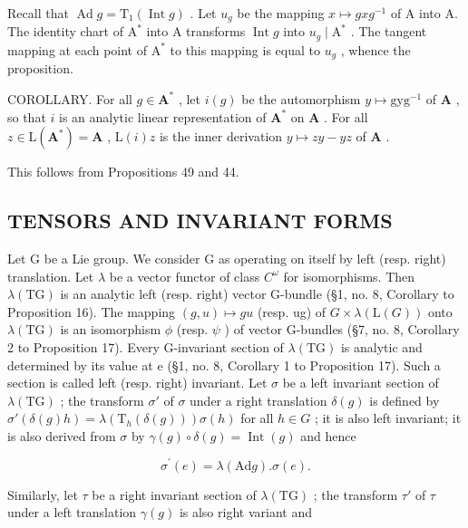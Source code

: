 Recall that \(\operatorname{Ad} g = \mathrm{T}_{1}(\operatorname{Int} g)\) . Let \(u_{g}\) be the mapping \(x \mapsto gxg^{-1}\) of A into A. The identity chart of \(\mathrm{A}^{*}\) into A transforms \(\operatorname{Int} g\) into \(u_{g} \mid \mathrm{A}^{*}\) . The tangent mapping at each point of \(\mathrm{A}^{*}\) to this mapping is equal to \(u_{g}\) , whence the proposition.

COROLLARY. For all \(g \in \mathbf{A}^*\) , let \(i(g)\) be the automorphism \(y \mapsto \mathrm{gyg}^{-1}\) of \(\mathbf{A}\) , so that \(i\) is an analytic linear representation of \(\mathbf{A}^*\) on \(\mathbf{A}\) . For all \(z \in \mathrm{L}(\mathbf{A}^*) = \mathbf{A}\) , \(\mathrm{L}(i)z\) is the inner derivation \(y \mapsto zy - yz\) of \(\mathbf{A}\) .

This follows from Propositions 49 and 44.

\subsection{TENSORS AND INVARIANT FORMS}

Let G be a Lie group. We consider G as operating on itself by left (resp. right) translation. Let \(\lambda\) be a vector functor of class \(C^{\omega}\) for isomorphisms. Then \(\lambda(\mathrm{TG})\) is an analytic left (resp. right) vector G-bundle (§1, no. 8, Corollary to Proposition 16). The mapping \((g, u) \mapsto gu\) (resp. ug) of \(G \times \lambda(\mathrm{L}(G))\) onto \(\lambda(\mathrm{TG})\) is an isomorphism \(\phi\) (resp. \(\psi\) ) of vector G-bundles (§7, no. 8, Corollary 2 to Proposition 17). Every G-invariant section of \(\lambda(\mathrm{TG})\) is analytic and determined by its value at e (§1, no. 8, Corollary 1 to Proposition 17). Such a section is called left (resp. right) invariant. Let \(\sigma\) be a left invariant section of \(\lambda(\mathrm{TG})\) ; the transform \(\sigma'\) of \(\sigma\) under a right translation \(\delta(g)\) is defined by \(\sigma'(\delta(g)h) = \lambda(\mathrm{T}_{h}(\delta(g)))\sigma(h)\) for all \(h \in G\) ; it is also left invariant; it is also derived from \(\sigma\) by \(\gamma(g) \circ \delta(g) = \operatorname{Int}(g)\) and hence

\[
\sigma^ {\prime} (e) = \lambda (\mathrm{Ad} g). \sigma (e).\tag{26}
\]

Similarly, let \(\tau\) be a right invariant section of \(\lambda(\mathrm{TG})\) ; the transform \(\tau'\) of \(\tau\) under a left translation \(\gamma(g)\) is also right variant and

